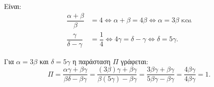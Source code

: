 
\begin{alist}
\item Είναι:
\begin{align*}
\dfrac{\alpha + \beta}{\beta} &= 4 \Leftrightarrow \alpha + \beta = 4\beta \Leftrightarrow \alpha = 3\beta\text{ και} \\
\dfrac{\gamma}{\delta - \gamma} &= \dfrac{1}{4} \Leftrightarrow 4\gamma = \delta - \gamma \Leftrightarrow \delta = 5\gamma.
\end{align*}

\item Για $\alpha = 3\beta$ και $\delta = 5\gamma$ η παράσταση $\Pi$ γράφεται:
\[\Pi = \dfrac{\alpha\gamma + \beta\gamma}{\beta\delta - \beta\gamma} = \dfrac{(3\beta)\gamma + \beta\gamma}{\beta(5\gamma) - \beta\gamma} = \dfrac{3\beta\gamma + \beta\gamma}{5\beta\gamma - \beta\gamma} = \dfrac{4\beta\gamma}{4\beta\gamma} = 1.\]
\end{alist}

